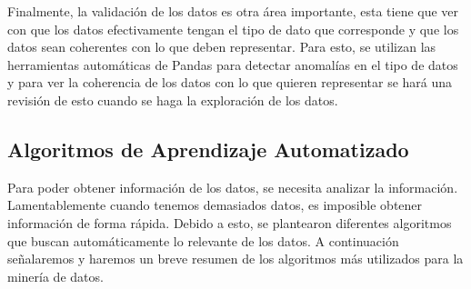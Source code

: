 Finalmente, la validación de los datos es otra área importante, esta tiene que ver con que los datos efectivamente tengan el tipo de dato que corresponde y que los datos sean coherentes con lo que deben representar. Para esto, se utilizan las herramientas automáticas de Pandas para detectar anomalías en el tipo de datos y para ver la coherencia de los datos con lo que quieren representar se hará una revisión de esto cuando se haga la exploración de los datos.
\subsection{Algoritmos de Aprendizaje Automatizado}
Para poder obtener información de los datos, se necesita analizar la información. Lamentablemente cuando tenemos demasiados datos, es imposible obtener información de forma rápida. Debido a esto, se plantearon diferentes algoritmos que buscan automáticamente lo relevante de los datos.
A continuación señalaremos y haremos un breve resumen de los algoritmos más utilizados para la minería de datos.



